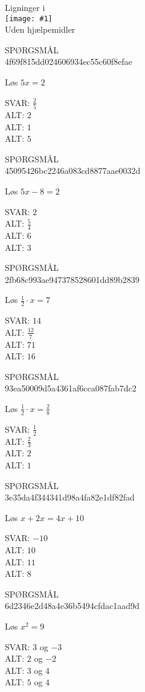 \documentclass[]{article}
\newenvironment{question}[2]{SPØRGSMÅL\\}{\hspace{50px}}
\newcommand{\name}[1]{{\huge #1}\\}
\newcommand{\tag}[1]{#1}
\newcommand{\cover}[1]{\texttt{[image: \#1]}\\}
\newcommand{\answer}[1]{{\color{green} SVAR: #1}\\}
\newcommand{\alt}[1]{{\color{red} ALT: #1}\\}
\begin{document}
\name{Ligninger i}
\cover{ligning1.png}
\tag{Uden hjælpemidler}

\begin{question}{multi}\id{4f69f815dd024606934ec55c60f8efae}
    
Løs $5x=2$

\answer{$\frac{2}{5}$}
\alt{$2$}
\alt{$1$}
\alt{$5$}

\end{question}

\begin{question}{multi}\id{45095426bc2246a083cd8877aae0032d}
    
    Løs $5x-8=2$
    
    \answer{$2$}
    \alt{$\frac{5}{4}$}
    \alt{$6$}
    \alt{$3$}
    
\end{question}

\begin{question}{multi}\id{2fb68c993ae947378528601dd89b2839}
    
    Løs $\frac{1}{2} \cdot x=7$
    
    \answer{$14$}
    \alt{$\frac{12}{7}$}
    \alt{$71$}
    \alt{$16$}
    
\end{question}

\begin{question}{multi}\id{93ea50009d5a4361af6cca087fab7dc2}
    
    Løs $\frac{1}{2} \cdot x=\frac{2}{8}$
    
    \answer{$\frac{1}{2}$}
    \alt{$\frac{2}{3}$}
    \alt{$2$}
    \alt{$1$}
    
\end{question}

\begin{question}{multi}\id{3e35da4f344341d98a4fa82e1df82fad}
    
    Løs $x + 2x = 4x + 10$
    
    \answer{$-10$}
    \alt{$10$}
    \alt{$11$}
    \alt{$8$}
    
\end{question}

\begin{question}{multi}\id{6d2346e2d48a4e36b5494cfdac1aad9d}
    
    Løs $x^2=9$
    
    \answer{$3$ og $-3$}
    \alt{$2$ og $-2$}
    \alt{$3$ og $4$}
    \alt{$5$ og $4$}
    
\end{question}
\end{document}
